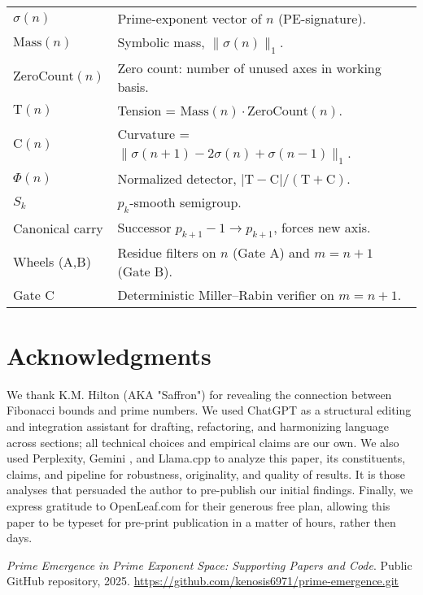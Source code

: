 \documentclass[11pt]{article}
\theoremstyle{plain}
\theoremstyle{definition}
\newcommand{\mass}{\mathrm{Mass}}                            %
\newcommand{\zcount}{\mathrm{ZeroCount}}                    %
\newcommand{\tension}{\mathrm{T}}                           %
\newcommand{\curv}{\mathrm{C}}                              %
\newcommand{\phidet}{\Phi}                                  %
\begin{document}
\begin{tabular}{ll}
$\sigma(n)$ & Prime-exponent vector of $n$ (PE-signature). \\
$\mass(n)$ & Symbolic mass, $\|\sigma(n)\|_1$. \\
$\zcount(n)$ & Zero count: number of unused axes in working basis. \\
$\tension(n)$ & Tension = $\mass(n)\cdot\zcount(n)$. \\
$\curv(n)$ & Curvature = $\|\sigma(n+1)-2\sigma(n)+\sigma(n-1)\|_1$. \\
$\phidet(n)$ & Normalized detector, $|\tension-\curv|/(\tension+\curv)$. \\
$S_k$ & $p_k$-smooth semigroup. \\
Canonical carry & Successor $p_{k+1}-1 \to p_{k+1}$, forces new axis. \\
Wheels (A,B) & Residue filters on $n$ (Gate A) and $m=n+1$ (Gate B). \\
Gate C & Deterministic Miller–Rabin verifier on $m=n+1$. \\
\end{tabular}

\section*{Acknowledgments}
We thank K.M. Hilton (AKA "Saffron") for revealing the connection between Fibonacci bounds and prime numbers.  We used ChatGPT as a structural editing and integration assistant for drafting, refactoring, and harmonizing language across sections; all technical choices and empirical claims are our own.  We also used Perplexity, Gemini , and Llama.cpp to analyze this paper, its constituents, claims, and pipeline for robustness, originality, and quality of results.  It is those analyses that persuaded the author to pre-publish our initial findings.   Finally, we express gratitude to OpenLeaf.com for their generous free plan, allowing this paper to be typeset for pre-print publication in a matter of hours, rather then days.  

\begin{thebibliography}{9}

\newblock \emph{Prime Emergence in Prime Exponent Space: Supporting Papers and Code}.
\newblock Public GitHub repository, 2025.
\newblock \url{https://github.com/kenosis6971/prime-emergence.git}

\end{thebibliography}
\end{document}
